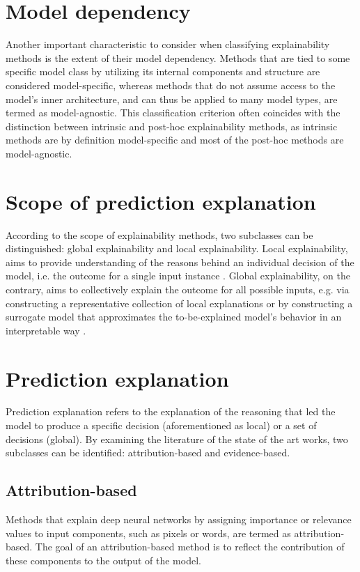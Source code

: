 \documentclass[journal]{IEEEtran}
\begin{document}
\section{Model dependency}
Another important characteristic to consider when classifying explainability methods is the extent of their model dependency. Methods that are tied to some specific model class by utilizing its internal components and structure are considered model-specific, whereas methods that do not assume access to the model’s inner architecture, and can thus be applied to many model types, are termed as model-agnostic. This classification criterion often coincides with the distinction between intrinsic and post-hoc explainability methods, as intrinsic methods are by definition model-specific and most of the post-hoc methods are model-agnostic. \cite{Adadi2018} \cite{Carvalho2019}

\section{Scope of prediction explanation}
According to the scope of explainability methods, two subclasses can be distinguished: global explainability and local explainability. Local explainability, aims to provide understanding of the reasons behind an individual decision of the model, i.e. the outcome for a single input instance \cite{Adadi2018}. Global explainability, on the contrary, aims to collectively explain the outcome for all possible inputs, e.g. via constructing a representative collection of local explanations or by constructing a surrogate model that approximates the to-be-explained model's behavior in an interpretable way \cite{Lakkaraju2020}.

\section{Prediction explanation}
Prediction explanation refers to the explanation of the reasoning that led the model to produce a specific decision (aforementioned as local) or a set of decisions (global). By examining the literature of the state of the art works, two subclasses can be identified: attribution-based and evidence-based.

\subsection{Attribution-based} 
Methods that explain deep neural networks by assigning importance or relevance values to input components, such as pixels or words, are termed as attribution-based. The goal of an attribution-based method is to reflect the contribution of these components to the output of the model. \cite{Singh2020} 
\end{document}
